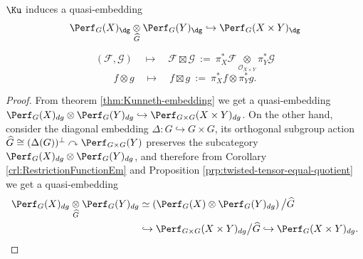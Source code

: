 \begin{crl}
    $\Ku$ induces a quasi-embedding
$$
\Perf_G(X)_{\dg}
\underset{\widehat{G}}{\otimes}
\Perf_G(Y)_{\dg}
\hookrightarrow
\Perf_G(X\times Y)_{\dg}
$$

$$
(\mathcal{F},\mathcal{G})
\quad\mapsto\quad
\mathcal{F}\boxtimes\mathcal{G}
~:=~
\pi_X^*\mathcal{F}
\underset{\mathcal{O}_{X\times Y}}{\otimes}
\pi_Y^*\mathcal{G}
$$
$$
f\otimes g
\quad\mapsto\quad
f\boxtimes g
~:=~
\pi_X^*f
\otimes
\pi_Y^*g.
$$
\end{crl}
\begin{proof}
From theorem \ref{thm:Kunneth-embedding} we get a quasi-embedding\\ 
$\Perf_G (X)_{dg}\otimes\Perf_G(Y)_{dg}\hookrightarrow\Perf_{G\times G} (X\times Y)_{dg}$. On the other hand, consider the diagonal embedding $\Delta\colon G\hookrightarrow G\times G$, its orthogonal subgroup action $\widehat{G}\cong (\Delta (G))^{\perp}\curvearrowright\Perf_{G\times G} (Y)$ preserves the subcategory $\Perf_G (X)_{dg}\otimes\Perf_G(Y)_{dg}$, and therefore from Corollary \ref{crl:RestrictionFunctionEm} and Proposition \ref{prp:twisted-tensor-equal-quotient} we get a quasi-embedding \begin{align*}
    \Perf_G (X)_{dg}\underset{\widehat{G}}{\otimes}\Perf_G(Y)_{dg}&\simeq\left(\Perf_G(X)\otimes\Perf_G(Y)_{dg}\right)\big/\widehat{G}\\ 
    &\hookrightarrow\Perf_{G\times G} (X\times Y)_{dg}\big/\widehat{G}\hookrightarrow\Perf_G (X\times Y)_{dg}.\qedhere
\end{align*}
\end{proof}
